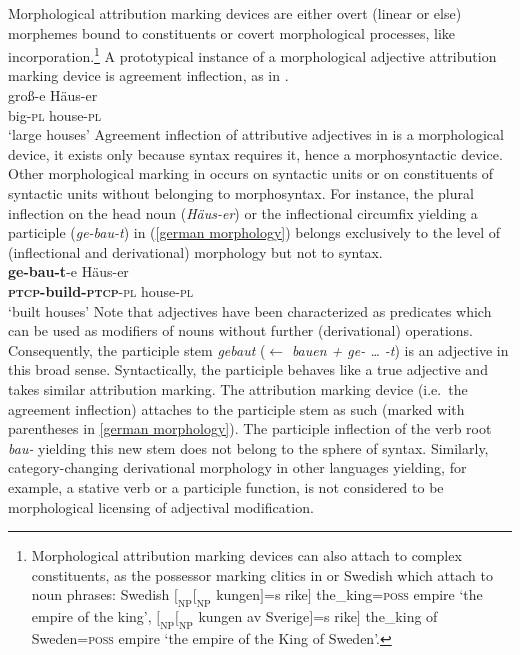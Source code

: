 Morphological attribution marking devices are either overt (linear or else) morphemes bound to constituents or covert morphological processes, like incorporation.\footnote{Morphological attribution marking devices can also attach to complex constituents, as the possessor marking clitics in  or Swedish which attach to noun phrases: Swedish $[_\textrm{NP} [_\textrm{NP}$ kungen$]$=s rike$]$ the\_king=\textsc{poss} empire ‘the empire of the king’, $[_\textrm{NP} [_\textrm{NP}$ kungen av Sverige$]$=s rike$]$ the\_king of Sweden=\textsc{poss} empire ‘the empire of the King of Sweden’.} A prototypical instance of a morphological adjective attribution marking device is agreement inflection, as in .
\ea
{}\\
\gll	groß-e Häus-er\\
	big-\textsc{pl} house-\textsc{pl}\\
\glt	‘large houses’
\z
Agreement inflection of attributive adjectives in  is a morphological device, it exists only because syntax requires it,  hence a morphosyntactic device. Other morphological marking in  occurs on syntactic units or on constituents of syntactic units without belonging to morphosyntax. For instance, the plural inflection on the head noun (\textit{Häus-er}) or the inflectional circumfix yielding a participle (\textit{ge-bau-t}) in (\ref{german morphology}) belongs exclusively to the level of (inflectional and derivational) morphology but not to syntax.
\ea\label{german morphology}
\\
\gll	\textbf{ge-bau-t}-e Häus-er\\
	\textbf{\textsc{ptcp}-build-\textsc{ptcp}}-\textsc{pl} house-\textsc{pl}\\
\glt	‘built houses’
\z
Note that adjectives have been characterized as predicates which can be used as modifiers of nouns without further (derivational) operations. Consequently, the  participle stem \textit{gebaut} ($\leftarrow$ \textit{bauen + ge- … -t}) is an adjective in this broad sense. Syntactically, the participle behaves like a true adjective and takes similar attribution marking. The attribution marking device (i.e.~the agreement inflection) attaches to the participle stem as such (marked with parentheses in \ref{german morphology}). The participle inflection of the verb root \textit{bau-} yielding this new stem does not belong to the sphere of syntax. Similarly, category-changing derivational morphology in other languages yielding, for example, a stative verb or a participle function, is not considered to be morphological licensing of adjectival modification.

